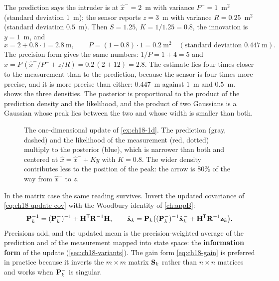 \begin{example}
\label{ex:ch18-1d}
The prediction says the intruder is at $\hat x^-=2$~m with variance $P^-=1$~m$^2$
(standard deviation $1$~m); the sensor reports $z=3$~m with variance
$R=0.25$~m$^2$ (standard deviation $0.5$~m). Then $S=1.25$, $K=1/1.25=0.8$,
the innovation is $y=1$~m, and
\[
  \hat x=2+0.8\cdot1=2.8~\mathrm{m},\qquad P=(1-0.8)\cdot1=0.2~\mathrm{m^2}
  \quad(\text{standard deviation }0.447~\mathrm{m}).
\]
The precision form gives the same numbers: $1/P=1+4=5$ and
$\hat x=P\,(\hat x^-/P^-+z/R)=0.2\,(2+12)=2.8$. The estimate lies four times
closer to the measurement than to the prediction, because the sensor is four
times more precise, and it is more precise than either: $0.447$~m against
$1$~m and $0.5$~m.  shows the three densities. The
posterior is proportional to the product of the prediction density and the
likelihood, and the product of two Gaussians is a Gaussian whose peak lies
between the two and whose width is smaller than both.
\end{example}

\begin{figure}[tb]
  \centering
  \caption{The one-dimensional update of \cref{ex:ch18-1d}. The prediction
  (gray, dashed) and the likelihood of the measurement (red, dotted) multiply
  to the posterior (blue), which is narrower than both and centered at
  $\hat x=\hat x^-+Ky$ with $K=0.8$. The wider density contributes less to the
  position of the peak: the arrow is $80\%$ of the way from $\hat x^-$ to $z$.}
  \label{fig:ch18-gain1d}
\end{figure}

In the matrix case the same reading survives. Invert the updated covariance of
\cref{eq:ch18-update-cov} with the Woodbury identity of \cref{ch:appB}:
\begin{equation}
  \mathbf{P}_k^{-1}=(\mathbf{P}^-_k)^{-1}+\mathbf{H}^{\mathsf{T}}\mathbf{R}^{-1}\mathbf{H},\qquad
  \hat{\mathbf{x}}_k=\mathbf{P}_k\bigl((\mathbf{P}^-_k)^{-1}\hat{\mathbf{x}}^-_k+\mathbf{H}^{\mathsf{T}}\mathbf{R}^{-1}\mathbf{z}_k\bigr).
  \label{eq:ch18-information}
\end{equation}
Precisions add, and the updated mean is the precision-weighted average of the
prediction and of the measurement mapped into state space: the
\textbf{information form} of the update
(\cref{sec:ch18-variants}). The gain form \cref{eq:ch18-gain} is preferred in
practice because it inverts the $m\times m$ matrix $\mathbf{S}_k$ rather than
$n\times n$ matrices and works when $\mathbf{P}^-_k$ is singular.

